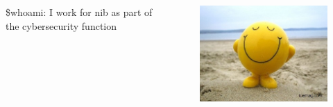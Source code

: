 \documentclass{beamer}
\begin{document}
\begin{frame}
    \begin{columns}
        \begin{column}{0.5\textwidth}
            \$whoami: I work for nib as part of the cybersecurity function
        \end{column}
        \begin{column}{0.5\textwidth}
            \begin{figure}
                \centering
                \includegraphics[width=\textwidth,keepaspectratio]{../resources/smile.jpg}
            \end{figure}
        \end{column}
    \end{columns}
\end{frame}
\end{document}

